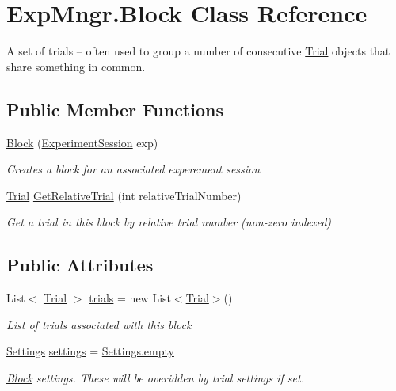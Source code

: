 \hypertarget{class_exp_mngr_1_1_block}{}\section{Exp\+Mngr.\+Block Class Reference}
\label{class_exp_mngr_1_1_block}


A set of trials – often used to group a number of consecutive \hyperlink{class_exp_mngr_1_1_trial}{Trial} objects that share something in common.  


\subsection*{Public Member Functions}
\begin{DoxyCompactItemize}
\item 
\hyperlink{class_exp_mngr_1_1_block_a88b6169c31950691fc310274673953e8}{Block} (\hyperlink{class_exp_mngr_1_1_experiment_session}{Experiment\+Session} exp)
\begin{DoxyCompactList}\small\item\em Creates a block for an associated experement session \end{DoxyCompactList}\item 
\hyperlink{class_exp_mngr_1_1_trial}{Trial} \hyperlink{class_exp_mngr_1_1_block_a3a97c3a7c705d2472649f01249f3db5a}{Get\+Relative\+Trial} (int relative\+Trial\+Number)
\begin{DoxyCompactList}\small\item\em Get a trial in this block by relative trial number (non-\/zero indexed) \end{DoxyCompactList}\end{DoxyCompactItemize}
\subsection*{Public Attributes}
\begin{DoxyCompactItemize}
\item 
List$<$ \hyperlink{class_exp_mngr_1_1_trial}{Trial} $>$ \hyperlink{class_exp_mngr_1_1_block_a4dc883b34888c374d391a1ed2a16b135}{trials} = new List$<$\hyperlink{class_exp_mngr_1_1_trial}{Trial}$>$()
\begin{DoxyCompactList}\small\item\em List of trials associated with this block \end{DoxyCompactList}\item 
\hyperlink{class_exp_mngr_1_1_settings}{Settings} \hyperlink{class_exp_mngr_1_1_block_a5392f1a9ba6398d764ba7f9663fcceed}{settings} = \hyperlink{class_exp_mngr_1_1_settings_a9a79c93bbbd6158a6ae543a615da6e6a}{Settings.\+empty}
\begin{DoxyCompactList}\small\item\em \hyperlink{class_exp_mngr_1_1_block}{Block} settings. These will be overidden by trial settings if set. \end{DoxyCompactList}\end{DoxyCompactItemize}
